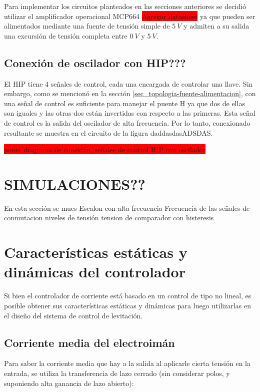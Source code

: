 Para implementar los circuitos planteados en las secciones anteriores se decidió utilizar el amplificador operacional MCP664 \colorbox{red}{Agregar datasheet} ya que pueden ser alimentados mediante una fuente de tensión simple de $5\:V$ y admiten a su salida una excursión de tensión completa entre $0\:V$ y $5\:V$. 

\subsection{Conexión de oscilador con HIP???}
El HIP tiene 4 señales de control, cada una encargada de controlar una llave. Sin embargo, como se mencionó en la sección \ref{sec_topologia-fuente-alimentacion}, con una señal de control es suficiente para manejar el puente H ya que dos de ellas son iguales y las otras dos están invertidas con respecto a las primeras. Esta señal de control es la salida del oscilador de alta frecuencia. Por lo tanto, conexionado resultante se muestra en el circuito de la figura daddasdasADSDAS.

\colorbox{red}{poner diagrama de conexión, señales de control HIP con oscilador}


\section{SIMULACIONES??}

En esta sección se mues
Escalon con alta frecuencia
Frecuencia de las señales de conmutacion
niveles de tensión
tension de comparador con histeresis

\section{Características estáticas y dinámicas del controlador}

Si bien el controlador de corriente está basado en un control de tipo no lineal, es posible obtener sus características estáticas y dinámicas para luego utilizarlas en el diseño del sistema de control de levitación.

\subsection{Corriente media del electroimán}

\noindent Para saber la corriente media que hay a la salida al aplicarle cierta tensión en la entrada, se utiliza la transferencia de lazo cerrado (sin considerar polos, y suponiendo alta ganancia de lazo abierto):

